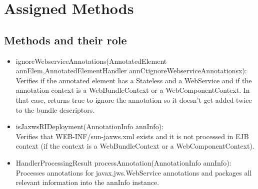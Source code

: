 \section{Assigned Methods}

	\subsection{Methods and their role}
		\begin{itemize}
			\item ignoreWebserviceAnnotations(AnnotatedElement annElem,AnnotatedElementHandler annCtignoreWebserviceAnnotationsx): \\ \hfill
			Verifies if the annotated element has a Stateless and a WebService and if the annotation
			context is a WebBundleContext or a WebComponentContext. In that case, returns true to ignore the annotation so it doesn't get added twice to the bundle descriptors.
			\item isJaxwsRIDeployment(AnnotationInfo annInfo): \\ \hfill
			Verifies that WEB-INF/sun-jaxws.xml exists and it is not processed in EJB context (if the context is a WebBundleContext or a WebComponentContext). 
			\item HandlerProcessingResult processAnnotation(AnnotationInfo annInfo): \\ \hfill
			Processes annotations for javax.jws.WebService annotations and packages all relevant information into the annInfo instance. 
			\end{itemize}
